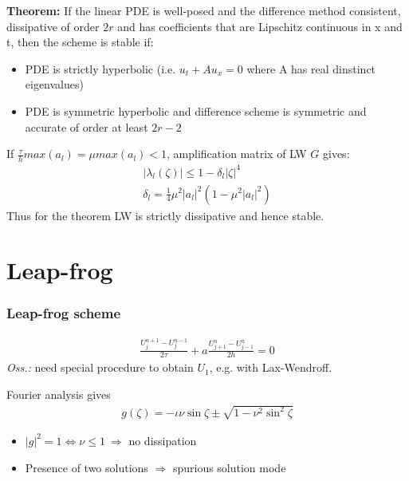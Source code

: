 \documentclass{beamer}
\begin{document}
\begin{frame}
\textbf{Theorem:} If the linear PDE is well-posed and the difference method consistent, dissipative of order $2r$ and has coefficients that are Lipschitz continuous in x and t, then the scheme is stable if:
\begin{itemize}
\setlength\itemsep{1em}
\item PDE is strictly hyperbolic (i.e. $u_t + Au_x = 0$ where A has real dinstinct eigenvalues)
\item PDE is symmetric hyperbolic and difference scheme is symmetric and accurate of order at least $2r- 2$
\end{itemize}
If $\frac{\tau}{h}max(a_l) = \mu max(a_l) < 1$, amplification matrix of LW $G$ gives:
\begin{align*}
|\lambda_l(\zeta)| \leq 1- \delta_l|\zeta|^4 \\
\delta_l = \frac{1}{4}\mu^2|a_l|^2(1-\mu^2|a_l|^2)
\end{align*}
Thus for the theorem LW is strictly dissipative and hence stable.
\end{frame}
\section{Leap-frog}
\begin{frame}
\frametitle{Leap-frog scheme}
\begin{align*}
\frac{U_j^{n+1} - U_j^{n-1}}{2\tau} + a \frac{U_{j+1}^n-U_{j-1}^n}{2h} = 0
\end{align*}
\textit{Oss.:} need special procedure to obtain $U_1$, e.g. with Lax-Wendroff.
\end{frame}
\begin{frame}
Fourier analysis gives
\begin{align*}
g(\zeta) = -\iota\nu\sin{\zeta} \pm \sqrt{1 - \nu^2\sin^2{\zeta}}
\end{align*}
\begin{itemize}
\setlength\itemsep{1em}
\item $|g|^2 = 1 \iff \nu \leq 1 \ \Rightarrow$ no dissipation
\item Presence of two solutions $\Rightarrow$ spurious solution mode
\end{itemize}
\end{frame}
\end{document}
